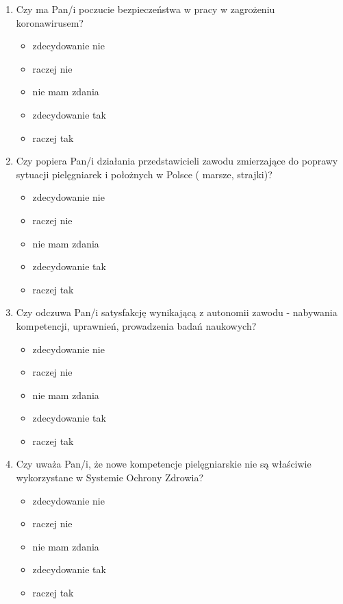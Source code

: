 \documentclass[a4paper,12pt,twoside,openright]{mwrep}
\begin{document}
\begin{enumerate}[label=\arabic*)]
			\item{Czy ma Pan/i poczucie bezpieczeństwa w pracy w zagrożeniu koronawirusem?}
		\begin{itemize}
			\item{zdecydowanie nie}
			\item{raczej nie}
			\item{nie mam zdania}
			\item{zdecydowanie tak}
			\item{raczej tak}
		\end{itemize}
		\vspace{\baselineskip}
		
			\item{ Czy popiera Pan/i działania przedstawicieli zawodu zmierzające do poprawy sytuacji pielęgniarek i położnych w Polsce ( marsze, strajki)?}
		\begin{itemize}
			\item{zdecydowanie nie}
			\item{raczej nie}
			\item{nie mam zdania}
			\item{zdecydowanie tak}
			\item{raczej tak}
		\end{itemize}
		\vspace{\baselineskip}
		
			\item{Czy odczuwa Pan/i satysfakcję wynikającą z autonomii zawodu  - nabywania kompetencji, uprawnień, prowadzenia badań naukowych?}
		\begin{itemize}
			\item{zdecydowanie nie}
			\item{raczej nie}
			\item{nie mam zdania}
			\item{zdecydowanie tak}
			\item{raczej tak}
		\end{itemize}
		\vspace{\baselineskip}
		
			\item{Czy uważa Pan/i, że nowe kompetencje pielęgniarskie nie są właściwie wykorzystane w Systemie Ochrony Zdrowia?}
		\begin{itemize}
			\item{zdecydowanie nie}
			\item{raczej nie}
			\item{nie mam zdania}
			\item{zdecydowanie tak}
			\item{raczej tak}
		\end{itemize}
		\vspace{\baselineskip}
		

\end{enumerate}
\end{document}
